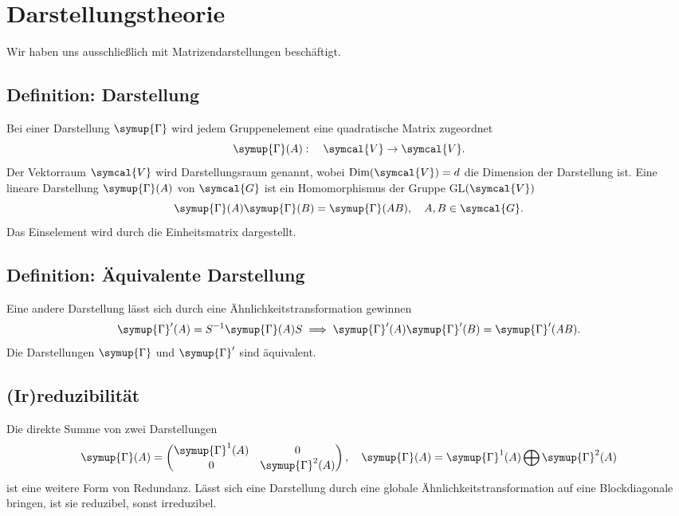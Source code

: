 \documentclass[
  captions=tableheading,  %
  titlepage=firstiscover, %
]{scrartcl}
\begin{document}
\section{Darstellungstheorie}
Wir haben uns ausschließlich mit Matrizendarstellungen beschäftigt.
\subsection{Definition: Darstellung}
Bei einer Darstellung $\symup{\Gamma}$ wird jedem Gruppenelement eine quadratische Matrix zugeordnet
\begin{equation*}
  \symup{\Gamma}(A) : \quad \symcal{V} \to \symcal{V}.
\end{equation*}
Der Vektorraum $\symcal{V}$ wird Darstellungsraum genannt, wobei $\text{Dim}(\symcal{V}) = d$ die Dimension der Darstellung ist.
Eine lineare Darstellung $\symup{\Gamma} (A)$ von $\symcal{G}$ ist ein Homomorphismus der Gruppe GL$(\symcal{V})$
\begin{equation*}
  \symup{\Gamma}(A) \symup{\Gamma}(B) = \symup{\Gamma}(AB), \quad A,B \in \symcal{G}.
\end{equation*} 
Das Einselement wird durch die Einheitsmatrix dargestellt.
\subsection{Definition: Äquivalente Darstellung}
Eine andere Darstellung lässt sich durch eine Ähnlichkeitstransformation gewinnen
\begin{equation*}
  \symup{\Gamma}'(A) = S^{-1} \symup{\Gamma} (A) S \implies \symup{\Gamma}'(A) \symup{\Gamma}'(B) = \symup{\Gamma}'(AB).
\end{equation*}
Die Darstellungen $\symup{\Gamma}$ und $\symup{\Gamma}'$ sind äquivalent.
\subsection{(Ir)reduzibilität}
Die direkte Summe von zwei Darstellungen 
\begin{equation*}
  \symup{\Gamma} (A) = 
  \begin{pmatrix}
    \symup{\Gamma}^1 (A)  & 0           \\
    0             & \symup{\Gamma}^2(A)
  \end{pmatrix}
  , \quad \symup{\Gamma} (A) = \symup{\Gamma}^1 (A)\bigoplus \symup{\Gamma}^2(A)
\end{equation*}
ist eine weitere Form von Redundanz.
Lässt sich eine Darstellung durch eine globale Ähnlichkeitstransformation auf eine Blockdiagonale
bringen, ist sie reduzibel, sonst irreduzibel.
\end{document}
